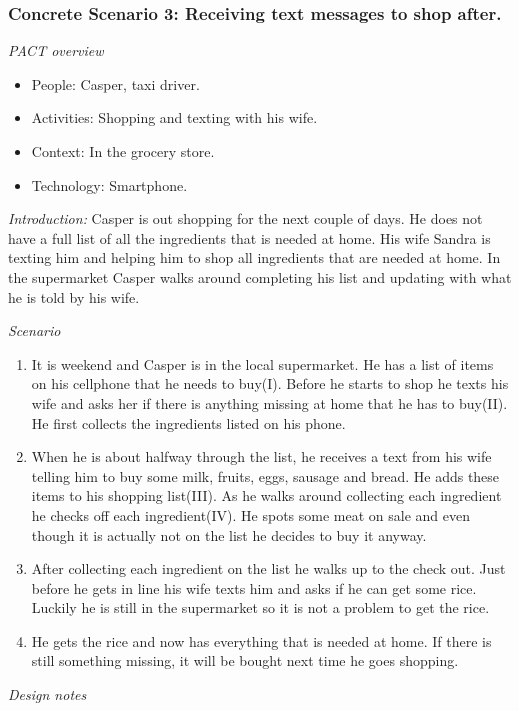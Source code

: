 \subsubsection{Concrete Scenario 3: Receiving text messages to shop after.} \label{ConcreteScenario3}

\emph{PACT overview}
\begin{itemize}
\item People: Casper, taxi driver.  
\item Activities: Shopping and texting with his wife.
\item Context: In the grocery store.
\item Technology: Smartphone.
\end{itemize}

\emph{Introduction:} Casper is out shopping for the next couple of days. He does not have a full list of all the ingredients that is needed at home. His wife Sandra is texting him and helping him to shop all ingredients that are needed at home. In the supermarket Casper walks around completing his list and updating with what he is told by his wife.  

\emph{Scenario}
\begin{enumerate}
\item It is weekend and Casper is in the local supermarket. He has a list of items on his cellphone that he needs to buy(I). Before he starts to shop he texts his wife and asks her if there is anything missing at home that he has to buy(II). He first collects the ingredients listed on his phone.   
\item  When he is about halfway through the list, he receives a text from his wife telling him to buy some milk, fruits, eggs, sausage and bread. He adds these items to his shopping list(III). As he walks around collecting each ingredient he checks off each ingredient(IV). He spots some meat on sale and even though it is actually not on the list he decides to buy it anyway.  
\item After collecting each ingredient on the list he walks up to the check out. Just before he gets in line his wife texts him and asks if he can get some rice. Luckily he is still in the supermarket so it is not a problem to get the rice.  
\item He gets the rice and now has everything that is needed at home. If there is still something missing, it will be bought next time he goes shopping.
\end{enumerate}

\emph{Design notes}

